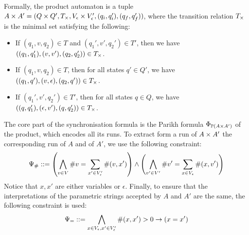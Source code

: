 \documentclass[sigplan,review,anonymous]{acmart}\settopmatter{printfolios=true,printccs=false,printacmref=false}
\begin{document}
Formally, the product automaton is a tuple $A \times A' = (Q\times Q', T_\times, V_\epsilon \times V'_\epsilon, (q_i,q_i'),(q_f,q_f'))$, where the transition relation $T_\times$ is the minimal set satisfying the following:
%
\begin{itemize}
\item If $(q_1,v,q_2) \in T$ and $(q_1',v',q_2') \in T'$, then we have $((q_1,q_1'),(v,v'),(q_2,q_2'))\in T_\times$.
\item If $(q_1,v,q_2) \in T$, then for all states $q'\in Q'$, we have $((q_1,q'),(v,\epsilon),(q_2,q'))\in T_\times$.
\item If $(q_1',v',q_2') \in T'$, then for all states $q\in Q$, we have $((q,q_1'),(\epsilon,v'),(q,q_2'))\in T_\times$.
\end{itemize}	
%
The core part of the synchronisation formula is the Parikh formula $\Phi_{\mathbb{P}{(A \times A')}}$ of the product, which encodes all its runs.
%
To extract form a run of $A \times A'$ the corresponding run of $A$ and of $A'$, we use the following constraint:
$$ \Psi_{\#} ::= 
\left(\bigwedge_{v\in V}\#v = \sum_{x' \in V'_\epsilon} \#{(v,x')}\right)
\land
\left(\bigwedge_{v'\in V'} \#v' = \sum_{x \in V_\epsilon} \#{(x,v')}\right)
$$
Notice that $x,x'$ are either variables or $\epsilon$.
Finally, to ensure that the interpretations of the parametric strings accepted by $A$ and $A'$ are the same, the following constraint is used:
$$ \Psi_= ::=
\bigwedge_{x\in V_\epsilon,x'\in V'_\epsilon} \#(x,x')>0 \rightarrow (x=x')
$$
\end{document}
